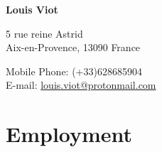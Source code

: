 \documentclass{article}
\begin{document}
{\huge \bf Louis Viot}\\
\bigskip
\begin{minipage}[t]{0.5\textwidth}
    5 rue reine Astrid \\
    Aix-en-Provence, 13090 France
\end{minipage}
\begin{minipage}[]{0.5\textwidth}
\begin{flushright}
	Mobile Phone: (+33)628685904 \\
	E-mail: \href{mailto:louis.viot@protonmail.com}{louis.viot@protonmail.com} \\
\end{flushright}
\end{minipage}

\section*{Employment}
\end{document}
